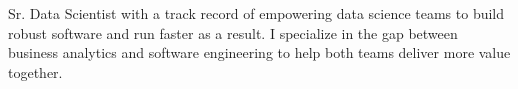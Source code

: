 
\begin{cvparagraph}

  Sr. Data Scientist with a track record of empowering data science teams to
  build robust software and run faster as a result. I specialize in the gap
  between business analytics and software engineering to help both teams deliver
  more value together.

\end{cvparagraph}
